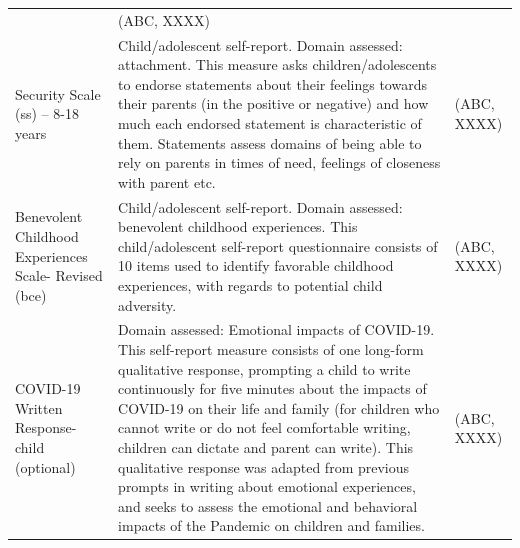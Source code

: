 \documentclass[]{book}
\begin{document}
\begin{longtable}[]{@{}lll@{}}
\begin{minipage}[t]{0.32\columnwidth}
\end{minipage} & \begin{minipage}[t]{0.27\columnwidth}\raggedright
(ABC, XXXX)\strut
\end{minipage}\tabularnewline
\begin{minipage}[t]{0.32\columnwidth}\raggedright
Security Scale (ss) -- 8-18 years\strut
\end{minipage} & \begin{minipage}[t]{0.32\columnwidth}\raggedright
Child/adolescent self-report. Domain assessed: attachment. This measure asks children/adolescents to endorse statements about their feelings towards their parents (in the positive or negative) and how much each endorsed statement is characteristic of them. Statements assess domains of being able to rely on parents in times of need, feelings of closeness with parent etc.\strut
\end{minipage} & \begin{minipage}[t]{0.27\columnwidth}\raggedright
(ABC, XXXX)\strut
\end{minipage}\tabularnewline
\begin{minipage}[t]{0.32\columnwidth}\raggedright
Benevolent Childhood Experiences Scale- Revised (bce)\strut
\end{minipage} & \begin{minipage}[t]{0.32\columnwidth}\raggedright
Child/adolescent self-report. Domain assessed: benevolent childhood experiences. This child/adolescent self-report questionnaire consists of 10 items used to identify favorable childhood experiences, with regards to potential child adversity.\strut
\end{minipage} & \begin{minipage}[t]{0.27\columnwidth}\raggedright
(ABC, XXXX)\strut
\end{minipage}\tabularnewline
\begin{minipage}[t]{0.32\columnwidth}\raggedright
COVID-19 Written Response- child (optional)\strut
\end{minipage} & \begin{minipage}[t]{0.32\columnwidth}\raggedright
Domain assessed: Emotional impacts of COVID-19. This self-report measure consists of one long-form qualitative response, prompting a child to write continuously for five minutes about the impacts of COVID-19 on their life and family (for children who cannot write or do not feel comfortable writing, children can dictate and parent can write). This qualitative response was adapted from previous prompts in writing about emotional experiences, and seeks to assess the emotional and behavioral impacts of the Pandemic on children and families.\strut
\end{minipage} & \begin{minipage}[t]{0.27\columnwidth}\raggedright
(ABC, XXXX)\strut
\end{minipage}\tabularnewline
\bottomrule
\end{longtable}
\end{document}
